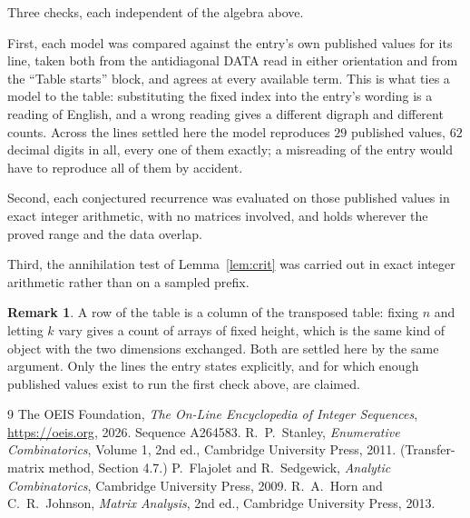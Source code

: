 \documentclass[11pt,a4paper]{article}
\theoremstyle{plain}
\theoremstyle{definition}
\newtheorem{remark}[theorem]{Remark}
\begin{document}
Three checks, each independent of the algebra above.

First, each model was compared against the entry's own published values for its line, taken
both from the antidiagonal DATA read in either orientation and from the ``Table starts''
block, and agrees at every available term. This is what ties a model to the table:
substituting the fixed index into the entry's wording is a reading of English, and a wrong
reading gives a different digraph and different counts. Across the lines settled here the
model reproduces $29$ published values, $62$ decimal digits in all, every one of
them exactly; a misreading of the entry would have to reproduce all of them by accident.

Second, each conjectured recurrence was evaluated on those published values in exact
integer arithmetic, with no matrices involved, and holds wherever the proved range and the
data overlap.

Third, the annihilation test of Lemma~\ref{lem:crit} was carried out in exact integer
arithmetic rather than on a sampled prefix.

\begin{remark}
A row of the table is a column of the transposed table: fixing $n$ and letting $k$ vary gives a
count of arrays of fixed height, which is the same kind of object with the two dimensions
exchanged. Both are settled here by the same argument. Only the lines the entry states
explicitly, and for which enough published values exist to run the first check above, are
claimed.
\end{remark}

\begin{thebibliography}{9}
 The OEIS Foundation, \emph{The On-Line Encyclopedia of Integer
Sequences}, \url{https://oeis.org}, 2026. Sequence A264583.
 R.~P.~Stanley, \emph{Enumerative Combinatorics}, Volume 1, 2nd ed.,
Cambridge University Press, 2011. (Transfer-matrix method, Section 4.7.)
 P.~Flajolet and R.~Sedgewick, \emph{Analytic Combinatorics}, Cambridge
University Press, 2009.
 R.~A.~Horn and C.~R.~Johnson, \emph{Matrix Analysis}, 2nd ed., Cambridge
University Press, 2013.
\end{thebibliography}
\end{document}
